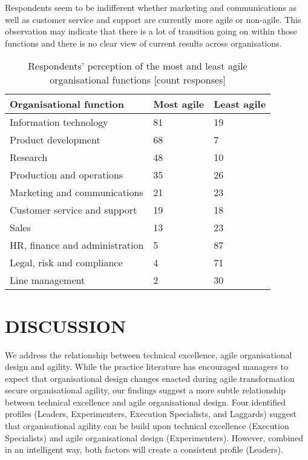 \documentclass{article}
\begin{document}
Respondents seem to be indifferent whether marketing and communications as well as customer service and support are currently more agile or non-agile. This observation may indicate that there is a lot of transition going on within those functions and there is no clear view of current results across organisations.
%
\begin{table}[hbt]
 \small
 \caption{Respondents' perception of the most and least agile organisational functions [count responses]}
  \centering
  \begin{tabular}{lll}
    Organisational function & Most agile & Least agile \\
    \midrule
    Information technology & 81 & 19 \\
    Product development & 68 & 7 \\
    Research & 48 & 10\\
    Production and operations & 35 & 26\\
    Marketing and communications & 21 & 23\\
    Customer service and support & 19 & 18\\
    Sales & 13 & 23\\
    HR, finance and administration & 5 & 87\\
    Legal, risk and compliance & 4 & 71\\
    Line management & 2 & 30\\
    \midrule
  \end{tabular}
  \label{tab:business-agility}
 \end{table}



\section{DISCUSSION}

We address the relationship between technical excellence, agile organisational design and agility. While the practice literature has encouraged managers to expect that organisational design changes enacted during agile transformation secure organisational agility, our findings suggest a more subtle relationship between technical excellence and agile organisational design. Four identified profiles (Leaders, Experimenters, Execution Specialists, and Laggards) suggest that organisational agility can be build upon technical excellence (Execution Specialists) and agile organisational design (Experimenters). However, combined in an intelligent way, both factors will create a consistent profile (Leaders).
\end{document}
